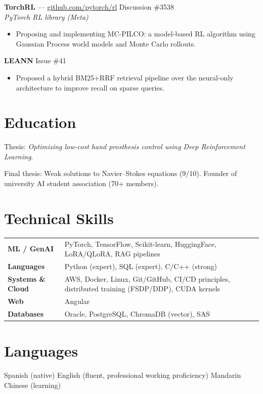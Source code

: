 \documentclass[10pt,a4paper]{article}
\begin{document}
\vspace{4pt}
\noindent
\textbf{TorchRL} --- \href{https://github.com/pytorch/rl}{github.com/pytorch/rl} \hfill Discussion \#3538\\
\textit{PyTorch RL library (Meta)}
\begin{itemize}
  \item Proposing and implementing MC-PILCO: a model-based RL algorithm using Gaussian Process world models and Monte Carlo rollouts.
\end{itemize}

\vspace{4pt}
\noindent
\textbf{LEANN} \hfill Issue \#41
\begin{itemize}
  \item Proposed a hybrid BM25+RRF retrieval pipeline over the neural-only architecture to improve recall on sparse queries.
\end{itemize}

\section{Education}

\par Thesis: \emph{Optimizing low-cost hand prosthesis control using Deep Reinforcement Learning}.

\vspace{4pt}
\par Final thesis: Weak solutions to Navier--Stokes equations (9/10). Founder of university AI student association (70+ members).

\section{Technical Skills}

\renewcommand{\arraystretch}{1.25}
\begin{tabularx}{\linewidth}{@{} l X @{}}
  \textbf{ML / GenAI}       & PyTorch, TensorFlow, Scikit-learn, HuggingFace, LoRA/QLoRA, RAG pipelines \\
  \textbf{Languages}        & Python (expert), SQL (expert), C/C++ (strong) \\
  \textbf{Systems \& Cloud} & AWS, Docker, Linux, Git/GitHub, CI/CD principles, distributed training (FSDP/DDP), CUDA kernels \\
  \textbf{Web}              & Angular \\
  \textbf{Databases}        & Oracle, PostgreSQL, ChromaDB (vector), SAS \\
\end{tabularx}

\section{Languages}
Spanish (native) \quad English (fluent, professional working proficiency) \quad Mandarin Chinese (learning)
\end{document}
